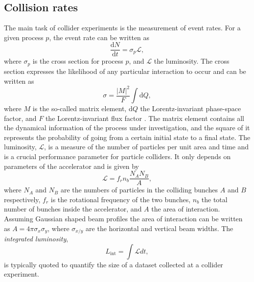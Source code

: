 \subsection{Collision rates}
\label{subsec:collision-rates}
The main task of collider experiments is the measurement of event rates. 
For a given process $p$, the event rate can be written as
\begin{equation}
  \frac{\mathrm{d}N}{\mathrm{d}t} = \sigma_p \mathcal{L},
\end{equation}
where $\sigma_p$ is the cross section for process $p$, and $\mathcal{L}$ the luminosity.
The cross section expresses the likelihood of any particular interaction to occur and can be written as
\begin{equation}
  \label{eq:xsec}
  \sigma = \frac{|M|^2}{F} \int \text{d}Q,
\end{equation}
where $M$ is the so-called matrix element, d$Q$ the Lorentz-invariant phase-space factor, and $F$ the Lorentz-invariant flux factor \cite{Halzen:1984mc}. 
The matrix element contains all the dynamical information of the process under investigation, and the square of it represents the probability of going from a certain initial state to a final state. 
The luminosity, $\mathcal{L}$, is a measure of the number of particles per unit area and time and is a crucial performance parameter for particle colliders. It only depends on parameters of the accelerator and is given by
\begin{equation}
  \mathcal{L} = f_rn_b\frac{N_A N_B}{A},
\end{equation}
where $N_A$ and $N_B$ are the numbers of particles in the colliding bunches $A$ and $B$ respectively, $f_r$ is the rotational frequency of the two bunches, $n_b$ the total number of bunches inside the accelerator, and $A$ the area of interaction. Assuming Gaussian shaped beam profiles the area of interaction can be written as $A = 4\pi \sigma_x \sigma_y$, where $\sigma_{x/y}$ are the horizontal and vertical beam widths.
The \emph{integrated luminosity}, 
\begin{equation}
  L_\text{int} = \int \mathcal{L} dt,
\end{equation}
is typically quoted to quantify the size of a dataset collected at a collider experiment.


